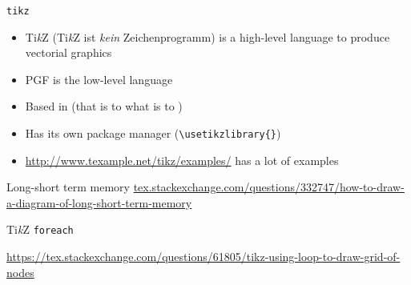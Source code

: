 \documentclass[english]{beamer}
\let\olditem\item
\renewcommand{\item}{\setlength{\itemsep}{\fill}\olditem}
\let\textttt\texttt
\renewcommand{\texttt}[1]{\colorbox{gray!10}{\textttt{#1}}}
\begin{document}
\begin{frame}[fragile]{\texttt{tikz}}
    \begin{itemize}
        \item Ti\textit{k}Z (Ti\textit{k}Z ist \textit{kein} Zeichenprogramm) is a high-level language to produce vectorial graphics
        \item PGF is the low-level language
        \item Based in  (that is to  what  is to )
        \item Has its own package manager (\verb|\usetikzlibrary{}|)
        \item \url{http://www.texample.net/tikz/examples/} has a lot of examples
    \end{itemize}
\end{frame}

\begin{frame}{Long-short term memory}
\url{tex.stackexchange.com/questions/332747/how-to-draw-a-diagram-of-long-short-term-memory}
\end{frame}

\begin{frame}{Ti\textit{k}Z \texttt{foreach}}

\url{https://tex.stackexchange.com/questions/61805/tikz-using-loop-to-draw-grid-of-nodes}
\end{frame}
\end{document}
